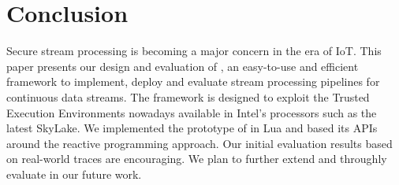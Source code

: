 \section{Conclusion}
\label{sec:conclusion}
Secure stream processing is becoming a major concern in the era of IoT. 
This paper presents our design and evaluation of \SYS, an easy-to-use and efficient framework to implement, deploy and evaluate stream processing pipelines for continuous data streams.
The framework is designed to exploit the Trusted Execution Environments nowadays available in Intel's processors such as the latest SkyLake. 
We implemented the prototype of \SYS in Lua and based its APIs around the reactive programming approach.
Our initial evaluation results based on real-world traces are encouraging. 
We plan to further extend and throughly evaluate \SYS in our future work.
